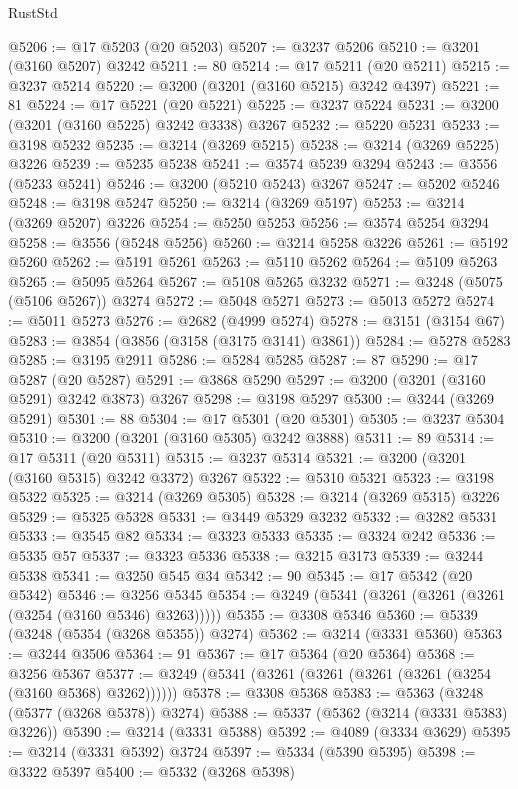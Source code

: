 \begin{lexlean}{RustStd}
\begin{coremodule}
@5206 := @17 @5203 (@20 @5203)
@5207 := @3237 @5206
@5210 := @3201 (@3160 @5207) @3242
@5211 := 80
@5214 := @17 @5211 (@20 @5211)
@5215 := @3237 @5214
@5220 := @3200 (@3201 (@3160 @5215) @3242 @4397)
@5221 := 81
@5224 := @17 @5221 (@20 @5221)
@5225 := @3237 @5224
@5231 := @3200 (@3201 (@3160 @5225) @3242 @3338) @3267
@5232 := @5220 @5231
@5233 := @3198 @5232
@5235 := @3214 (@3269 @5215)
@5238 := @3214 (@3269 @5225) @3226
@5239 := @5235 @5238
@5241 := @3574 @5239 @3294
@5243 := @3556 (@5233 @5241)
@5246 := @3200 (@5210 @5243) @3267
@5247 := @5202 @5246
@5248 := @3198 @5247
@5250 := @3214 (@3269 @5197)
@5253 := @3214 (@3269 @5207) @3226
@5254 := @5250 @5253
@5256 := @3574 @5254 @3294
@5258 := @3556 (@5248 @5256)
@5260 := @3214 @5258 @3226
@5261 := @5192 @5260
@5262 := @5191 @5261
@5263 := @5110 @5262
@5264 := @5109 @5263
@5265 := @5095 @5264
@5267 := @5108 @5265 @3232
@5271 := @3248 (@5075 (@5106 @5267)) @3274
@5272 := @5048 @5271
@5273 := @5013 @5272
@5274 := @5011 @5273
@5276 := @2682 (@4999 @5274)
@5278 := @3151 (@3154 @67)
@5283 := @3854 (@3856 (@3158 (@3175 @3141) @3861))
@5284 := @5278 @5283
@5285 := @3195 @2911
@5286 := @5284 @5285
@5287 := 87
@5290 := @17 @5287 (@20 @5287)
@5291 := @3868 @5290
@5297 := @3200 (@3201 (@3160 @5291) @3242 @3873) @3267
@5298 := @3198 @5297
@5300 := @3244 (@3269 @5291)
@5301 := 88
@5304 := @17 @5301 (@20 @5301)
@5305 := @3237 @5304
@5310 := @3200 (@3201 (@3160 @5305) @3242 @3888)
@5311 := 89
@5314 := @17 @5311 (@20 @5311)
@5315 := @3237 @5314
@5321 := @3200 (@3201 (@3160 @5315) @3242 @3372) @3267
@5322 := @5310 @5321
@5323 := @3198 @5322
@5325 := @3214 (@3269 @5305)
@5328 := @3214 (@3269 @5315) @3226
@5329 := @5325 @5328
@5331 := @3449 @5329 @3232
@5332 := @3282 @5331
@5333 := @3545 @82
@5334 := @3323 @5333
@5335 := @3324 @242
@5336 := @5335 @57
@5337 := @3323 @5336
@5338 := @3215 @3173
@5339 := @3244 @5338
@5341 := @3250 @545 @34
@5342 := 90
@5345 := @17 @5342 (@20 @5342)
@5346 := @3256 @5345
@5354 := @3249 (@5341 (@3261 (@3261 (@3261 (@3254 (@3160 @5346) @3263)))))
@5355 := @3308 @5346
@5360 := @5339 (@3248 (@5354 (@3268 @5355)) @3274)
@5362 := @3214 (@3331 @5360)
@5363 := @3244 @3506
@5364 := 91
@5367 := @17 @5364 (@20 @5364)
@5368 := @3256 @5367
@5377 := @3249 (@5341 (@3261 (@3261 (@3261 (@3261 (@3254 (@3160 @5368) @3262))))))
@5378 := @3308 @5368
@5383 := @5363 (@3248 (@5377 (@3268 @5378)) @3274)
@5388 := @5337 (@5362 (@3214 (@3331 @5383) @3226))
@5390 := @3214 (@3331 @5388)
@5392 := @4089 (@3334 @3629)
@5395 := @3214 (@3331 @5392) @3724
@5397 := @5334 (@5390 @5395)
@5398 := @3322 @5397
@5400 := @5332 (@3268 @5398)

\end{coremodule}
\end{lexlean}
